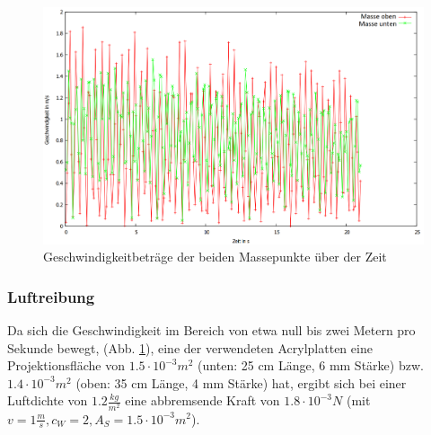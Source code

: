 \begin{figure}
        \includegraphics[width=.9\textwidth]{images/v_ueber_t_neu.png}
\caption{Geschwindigkeitbeträge der beiden Massepunkte über der Zeit}
\label{v_ueber_t}
\end{figure}


\subsubsection{Luftreibung}
Da sich die Geschwindigkeit im Bereich von etwa null bis zwei Metern pro Sekunde bewegt, (Abb. \ref{v_ueber_t}), eine der verwendeten Acrylplatten eine Projektionsfläche von $ 1.5 \cdot 10^{-3} m^2$ (unten: 25 cm Länge, 6 mm Stärke) bzw. $ 1.4 \cdot 10^{-3} m^2$ (oben: 35 cm Länge, 4 mm Stärke) hat, ergibt sich bei einer Luftdichte von $ 1.2 \frac{kg}{m^2} $ eine abbremsende Kraft von $ 1.8 \cdot 10^{-3} N $ (mit $ v = 1 \frac{m}{s}, c_W = 2, A_S = 1.5 \cdot 10^{-3} m^2 $). 


